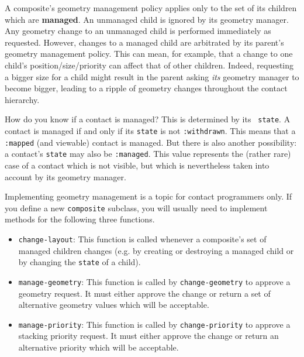 A composite's geometry management policy applies only to the set of its children
which are {\bf managed}. 
An unmanaged child is ignored by its geometry manager. Any
geometry change to an unmanaged child is performed immediately as requested. 
However, changes to a managed child are arbitrated by its parent's geometry
management policy. This can mean, for example, that a change to one child's
position/size/priority can affect that of other children. Indeed, requesting a
bigger size for a child might result in the parent asking {\em its} geometry
manager to become bigger, leading to a ripple of geometry changes throughout
the contact hierarchy.

How do you know if a contact is managed? This is determined by its {\tt
state}.
A contact is managed if and only if its {\tt state} is not {\tt :withdrawn}. This means
that a {\tt :mapped} (and viewable) contact is managed. But there is also
another possibility: a contact's {\tt state} may also be {\tt :managed}. This
value represents the (rather rare) case of a contact which is not visible, but
which is nevertheless taken into account by its geometry manager. 

\begin{center}
\end{center}


Implementing geometry management is a topic for contact programmers only. If you
define a new {\tt composite} subclass, you will usually need to implement
methods for the following three functions.
\begin{itemize} 
\item {\tt change-layout}: 
This function is called whenever a composite's set of
managed children changes (e.g. by creating or destroying a managed child or by
changing the {\tt state} of a child).

\item {\tt manage-geometry}: 
This function is called by {\tt change-geometry} to
approve a geometry request. It must either approve the change or return a set of
alternative geometry values which will be acceptable.

\item {\tt manage-priority}: 
This function is called by {\tt change-priority} to
approve a stacking priority request. It must either approve the change or return
an alternative priority which will be acceptable.

\end{itemize}

